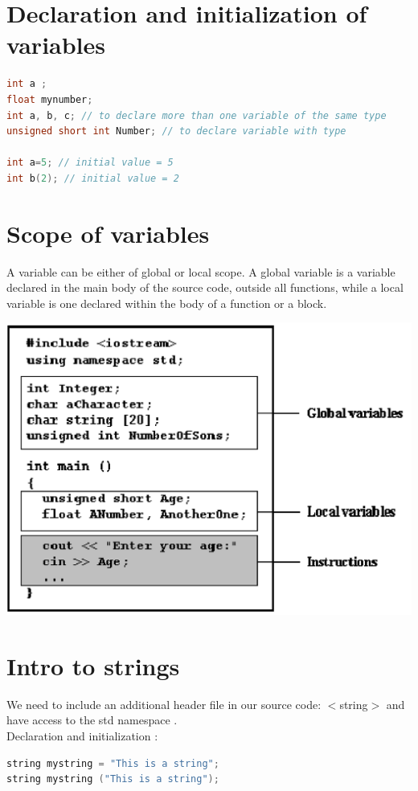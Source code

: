 \documentclass[12pt,oneside]{book}
\begin{document}
\section{Declaration and initialization of variables}
 \begin{lstlisting}[language=C++]
int a ;
float mynumber;
int a, b, c; // to declare more than one variable of the same type
unsigned short int Number; // to declare variable with type   

int a=5; // initial value = 5
int b(2); // initial value = 2
\end{lstlisting}
\pagebreak
\section{Scope of variables}

\begin{minipage}{0.6\linewidth}
    A variable can be either of global or local scope. A global variable is a variable declared in the main body of the source code, outside all functions, while a local variable is one declared within the body of a function or a block.
\end{minipage}
\begin{minipage}{0.4\linewidth}
    \includegraphics[width=\linewidth]{../pic/3316/22.png}
\end{minipage}

\section{Intro to strings}
We need to include an additional header file in our source code: $<$string$>$ and have access to the std namespace .\\
Declaration and initialization :
\begin{lstlisting}[language=C++]
string mystring = "This is a string";
string mystring ("This is a string");
\end{lstlisting}
\end{document}
